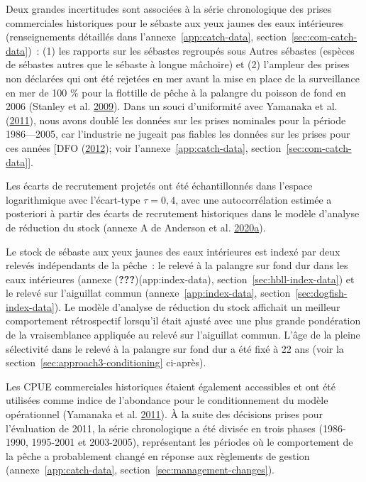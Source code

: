 \documentclass[11pt]{book}
\begin{document}
Deux grandes incertitudes sont associées à la série chronologique des prises commerciales historiques pour le sébaste aux yeux jaunes des eaux intérieures (renseignements détaillés dans l'annexe~\ref{app:catch-data}, section~\ref{sec:com-catch-data})~: (1) les rapports sur les sébastes regroupés sous Autres sébastes (espèces de sébastes autres que le sébaste à longue mâchoire) et (2) l'ampleur des prises non déclarées qui ont été rejetées en mer avant la mise en place de la surveillance en mer de 100 \% pour la flottille de pêche à la palangre du poisson de fond en 2006 (Stanley et al. \protect\hyperlink{ref-stanley2009}{2009}). Dans un souci d'uniformité avec Yamanaka et al. (\protect\hyperlink{ref-yamanaka2011}{2011}), nous avons doublé les données sur les prises nominales pour la période 1986---2005, car l'industrie ne jugeait pas fiables les données sur les prises pour ces années {[}DFO (\protect\hyperlink{ref-dfo2012}{2012}); voir l'annexe~\ref{app:catch-data}, section~\ref{sec:com-catch-data}{]}.

Les écarts de recrutement projetés ont été échantillonnés dans l'espace logarithmique avec l'écart-type \(\tau = 0,4\), avec une autocorrélation estimée a posteriori à partir des écarts de recrutement historiques dans le modèle d'analyse de réduction du stock (annexe A de Anderson et al. \protect\hyperlink{ref-anderson2020gfmp}{2020}\protect\hyperlink{ref-anderson2020gfmp}{a}).

Le stock de sébaste aux yeux jaunes des eaux intérieures est indexé par deux relevés indépendants de la pêche~: le relevé à la palangre sur fond dur dans les eaux intérieures (annexe ({\textbf{???}})(app:index-data), section~\ref{sec:hbll-index-data}) et le relevé sur l'aiguillat commun (annexe~\ref{app:index-data}, section~\ref{sec:dogfish-index-data}). Le modèle d'analyse de réduction du stock affichait un meilleur comportement rétrospectif lorsqu'il était ajusté avec une plus grande pondération de la vraisemblance appliquée au relevé sur l'aiguillat commun. L'âge de la pleine sélectivité dans le relevé à la palangre sur fond dur a été fixé à 22 ans (voir la section~\ref{sec:approach3-conditioning} ci-après).

Les CPUE commerciales historiques étaient également accessibles et ont été utilisées comme indice de l'abondance pour le conditionnement du modèle opérationnel (Yamanaka et al. \protect\hyperlink{ref-yamanaka2011}{2011}). À la suite des décisions prises pour l'évaluation de 2011, la série chronologique a été divisée en trois phases (1986-1990, 1995-2001 et 2003-2005), représentant les périodes où le comportement de la pêche a probablement changé en réponse aux règlements de gestion (annexe~\ref{app:catch-data}, section~\ref{sec:management-changes}).
\end{document}
